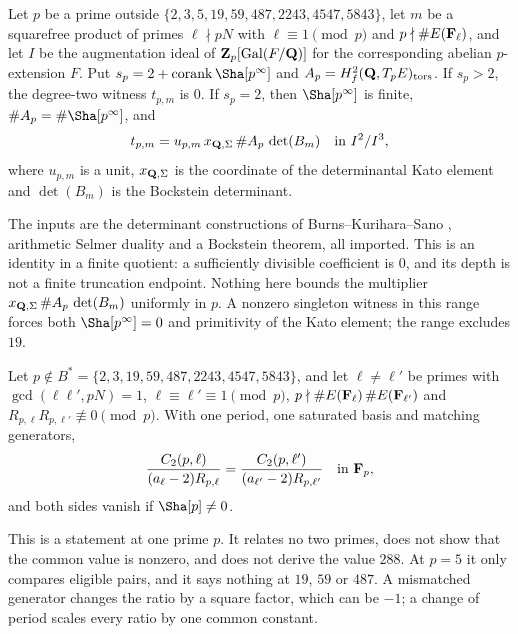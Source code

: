 \begin{researchrecord}\label{thm:katofact}
Let $p$ be a prime outside $\{2,3,5,19,59,487,2243,4547,5843\}$, let $m$ be a squarefree product of primes $\ell\nmid pN$ with $\ell\equiv1\pmod p$ and $p\nmid\#E(\mathbf{F}_\ell)$, and let $I$ be the augmentation ideal of $\mathbf{Z}_p[\operatorname{Gal}(F/\mathbf{Q})]$ for the corresponding abelian $p$-extension $F$. Put $s_p=2+\operatorname{corank}\Sha[p^\infty]$ and $A_p=H^2_f(\mathbf{Q},T_pE)_{\mathrm{tors}}$. If $s_p>2$, the degree-two witness $t_{p,m}$ is $0$. If $s_p=2$, then $\Sha[p^\infty]$ is finite, $\#A_p=\#\Sha[p^\infty]$, and
\[
t_{p,m}=u_{p,m}\,x_{\mathbf{Q},\Sigma}\,\#A_p\,\det(B_m)\quad\text{in }I^2/I^3,
\]
where $u_{p,m}$ is a unit, $x_{\mathbf{Q},\Sigma}$ is the coordinate of the determinantal Kato element and $\det(B_m)$ is the Bockstein determinant.
\end{researchrecord}
The inputs are the determinant constructions of Burns--Kurihara--Sano \cite{bks}, arithmetic Selmer duality and a Bockstein theorem, all imported. This is an identity in a finite quotient: a sufficiently divisible coefficient is $0$, and its depth is not a finite truncation endpoint. Nothing here bounds the multiplier $x_{\mathbf{Q},\Sigma}\,\#A_p\,\det(B_m)$ uniformly in $p$. A nonzero singleton witness in this range forces both $\Sha[p^\infty]=0$ and primitivity of the Kato element; the range excludes $19$.

\begin{researchrecord}\label{thm:w}
Let $p\notin B^*=\{2,3,19,59,487,2243,4547,5843\}$, and let $\ell\neq\ell'$ be primes with $\gcd(\ell\ell',pN)=1$, $\ell\equiv\ell'\equiv1\pmod p$, $p\nmid\#E(\mathbf{F}_\ell)\,\#E(\mathbf{F}_{\ell'})$ and $R_{p,\ell}R_{p,\ell'}\not\equiv0\pmod p$. With one period, one saturated basis and matching generators,
\[
\frac{C_2(p,\ell)}{(a_\ell-2)R_{p,\ell}}=\frac{C_2(p,\ell')}{(a_{\ell'}-2)R_{p,\ell'}}\quad\text{in }\mathbf{F}_p ,
\]
and both sides vanish if $\Sha[p]\ne0$.
\end{researchrecord}
This is a statement at one prime $p$. It relates no two primes, does not show that the common value is nonzero, and does not derive the value $288$. At $p=5$ it only compares eligible pairs, and it says nothing at $19$, $59$ or $487$. A mismatched generator changes the ratio by a square factor, which can be $-1$; a change of period scales every ratio by one common constant.

